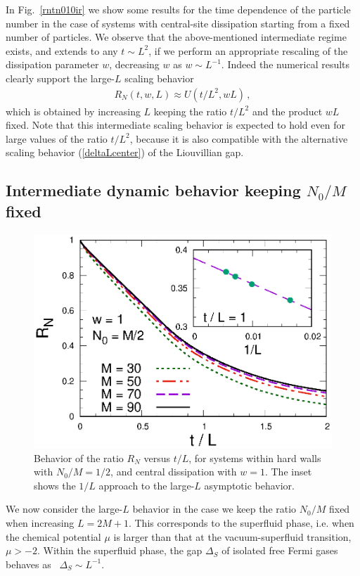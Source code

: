   
  In Fig.~\ref{rntn010ir} we show some results for the time dependence
  of the particle number in the case of systems with central-site
  dissipation starting from a fixed number of particles. We observe that
  the above-mentioned intermediate regime exists, and extends to any
  $t\sim L^2$, if we perform an appropriate rescaling of the dissipation
  parameter $w$, decreasing $w$ as $w\sim L^{-1}$. Indeed the numerical
  results clearly support the large-$L$ scaling behavior
  \begin{eqnarray}
   R_N(t,w,L) \approx U(t/L^2,wL)\,,   \label{scalbehwl}
  \end{eqnarray}
  which is obtained by increasing $L$ keeping the ratio $t/L^2$ and the
  product $wL$ fixed.  Note that this intermediate scaling behavior is
  expected to hold even for large values of the ratio $t/L^2$, because
  it is also compatible with the alternative scaling behavior
  (\ref{deltaLcenter}) of the Liouvillian gap.
  
  
  
  
  
  
  \subsection{Intermediate dynamic behavior keeping $N_0/M$ fixed}
  \label{N0oLfixed}
  
  \begin{figure}[!htb]
\centering
    \includegraphics[width=0.65\columnwidth]{imm/NLL1.eps}
    \caption{Behavior of the ratio $R_N$ versus $t/L$, for systems
      within hard walls with $N_0/M=1/2$, and central dissipation with
      $w=1$. The inset shows the $1/L$ approach to the large-$L$
      asymptotic behavior.}
    \label{rntn0lvstol}
  \end{figure}
  
  We now consider the large-$L$ behavior in the case we keep the ratio
  $N_0/M$ fixed when increasing $L=2M+1$. This corresponds to the
  superfluid phase, i.e. when the chemical potential $\mu$ is larger
  than that at the vacuum-superfluid transition, $\mu>-2$. Within the
  superfluid phase, the gap $\Delta_S$ of isolated free Fermi gases
  behaves as~\cite{S99} $\Delta_S \sim L^{-1}$.
  
